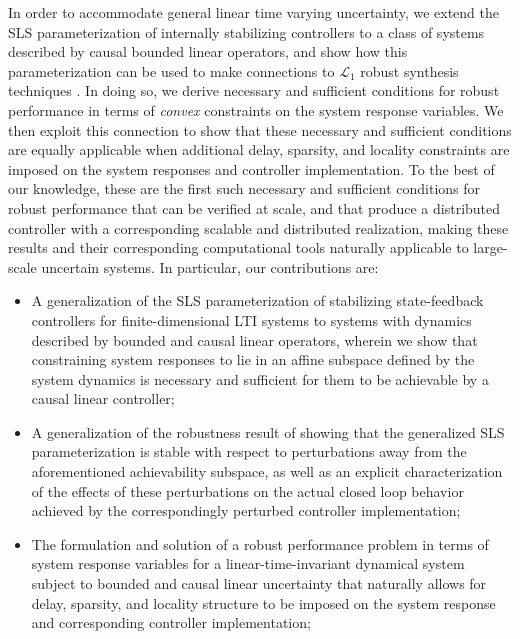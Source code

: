 In order to accommodate general linear time varying uncertainty, we extend the SLS parameterization of internally stabilizing controllers to a class of systems described by causal bounded linear operators, and show how this parameterization can be used to make connections to $\mathcal{L}_1$ robust synthesis techniques \cite{khammash1990stability,dahleh1994control}.  In doing so, we derive necessary and sufficient conditions for robust performance in terms of \emph{convex} constraints on the system response variables.  We then exploit this connection to show that these necessary and sufficient conditions are equally applicable when additional delay, sparsity, and locality constraints are imposed on the system responses and controller implementation.  To the best of our knowledge, these are the first such necessary and sufficient conditions for robust performance that can be verified at scale, and that produce a distributed controller with a corresponding scalable and distributed realization, making these results and their corresponding computational tools naturally applicable to large-scale uncertain systems.  In particular, our contributions are:
\begin{itemize}%
\item A generalization of the SLS parameterization of stabilizing state-feedback controllers for finite-dimensional LTI systems \cite{wang2019system} to systems with dynamics described by bounded and causal linear operators, wherein we show that constraining system responses to lie in an affine subspace defined by the system dynamics is necessary and sufficient for them to be achievable by a causal linear controller;
\item A generalization of the robustness result of \cite{matni2017scalable} showing that the  generalized SLS parameterization is stable with respect to perturbations away from the aforementioned achievability subspace, as well as an explicit characterization of the effects of these perturbations on the actual closed loop behavior achieved by the correspondingly perturbed controller implementation;
\item The formulation and solution of a robust performance problem in terms of system response variables for a linear-time-invariant dynamical system subject to bounded and causal linear uncertainty that naturally allows for delay, sparsity, and locality structure to be imposed on the system response and corresponding controller implementation;
\end{itemize}



